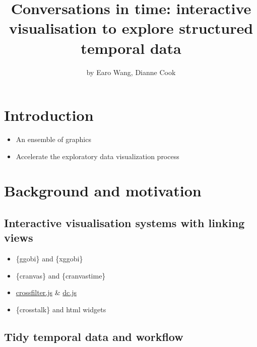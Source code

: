 \title{Conversations in time: interactive visualisation to explore
structured temporal data}
\author{by Earo Wang, Dianne Cook}

\maketitle


\hypertarget{introduction}{%
\section{Introduction}\label{introduction}}

\begin{itemize}
\tightlist
\item
  An ensemble of graphics
\item
  Accelerate the exploratory data visualization process
\end{itemize}

\hypertarget{background-and-motivation}{%
\section{Background and motivation}\label{background-and-motivation}}

\hypertarget{interactive-visualisation-systems-with-linking-views}{%
\subsection{Interactive visualisation systems with linking
views}\label{interactive-visualisation-systems-with-linking-views}}

\begin{itemize}
\tightlist
\item
  \{ggobi\} and \{xggobi\}
\item
  \{cranvas\} and \{cranvastime\}
\item
  \href{http://crossfilter.github.io/crossfilter/}{crossfilter.js} \&
  \href{https://dc-js.github.io/dc.js/}{dc.js}
\item
  \{crosstalk\} and html widgets
\end{itemize}

\hypertarget{tidy-temporal-data-and-workflow}{%
\subsection{Tidy temporal data and
workflow}\label{tidy-temporal-data-and-workflow}}

